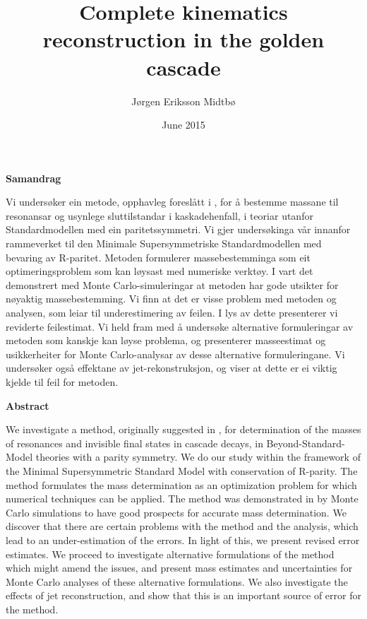 \documentclass[twoside,english]{uiofysmaster}
\author{J\o rgen Eriksson Midtb\o}
\title{Complete kinematics reconstruction in the golden cascade}
\date{June 2015}
\newenvironment{abstractpage}
  {\cleardoublepage\vspace*{\fill}\thispagestyle{empty}}
  {\vfill\cleardoublepage}
\renewenvironment{abstract}[1]
  {\bigskip\selectlanguage{#1}%
   }
  {\par\bigskip}
\begin{document}

\cleardoublepage

\begin{abstractpage}

\begin{center}
	\textbf{Samandrag}
\end{center}
\begin{abstract}{norsk}
    Vi unders{\o}ker ein metode, opphavleg foresl{\aa}tt i \cite{Webber:2009vm}, for {\aa} bestemme massane til resonansar og usynlege sluttilstandar i kaskadehenfall, i teoriar utanfor Standardmodellen med ein paritetssymmetri. Vi gjer unders{\o}kinga v{\aa}r innanfor rammeverket til den Minimale Supersymmetriske Standardmodellen med bevaring av R-paritet. Metoden formulerer massebestemminga som eit optimeringsproblem som kan l{\o}ysast med numeriske verkt{\o}y. I \cite{Webber:2009vm} vart det demonstrert med Monte Carlo-simuleringar at metoden har gode utsikter for n{\o}yaktig massebestemming. Vi finn at det er visse problem med metoden og analysen, som leiar til underestimering av feilen. I lys av dette presenterer vi reviderte feilestimat. Vi held fram med {\aa} unders{\o}ke alternative formuleringar av metoden som kanskje kan l{\o}yse problema, og presenterer masseestimat og usikkerheiter for Monte Carlo-analysar av desse alternative formuleringane. Vi unders{\o}ker ogs{\aa} effektane av jet-rekonstruksjon, og viser at dette er ei viktig kjelde til feil for metoden.
\end{abstract}

\begin{center}
	\textbf{Abstract}
\end{center}
\begin{abstract}{english}
    We investigate a method, originally suggested in \cite{Webber:2009vm}, for determination of the masses of resonances and invisible final states in cascade decays, in Beyond-Standard-Model theories with a parity symmetry. We do our study within the framework of the Minimal Supersymmetric Standard Model with conservation of R-parity. The method formulates the mass determination as an optimization problem for which numerical techniques can be applied. The method was demonstrated in \cite{Webber:2009vm} by Monte Carlo simulations to have good prospects for accurate mass determination. We discover that there are certain problems with the method and the analysis, which lead to an under-estimation of the errors. In light of this, we present revised error estimates. We proceed to investigate alternative formulations of the method which might amend the issues, and present mass estimates and uncertainties for Monte Carlo analyses of these alternative formulations. We also investigate the effects of jet reconstruction, and show that this is an important source of error for the method. 
\end{abstract}

\end{abstractpage}
\end{document}
